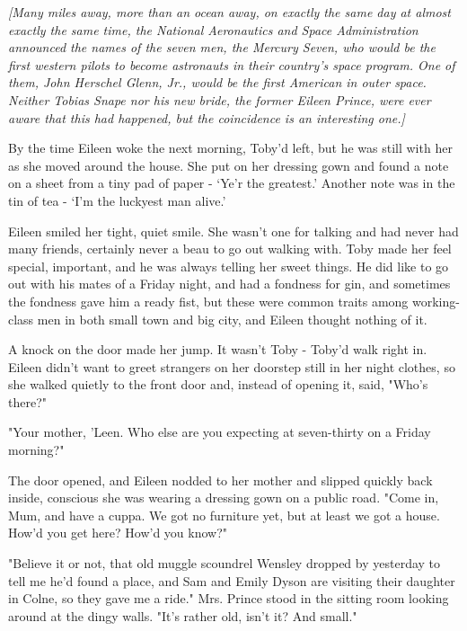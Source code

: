 \vspace{\baselineskip}

\emph{[Many miles away, more than an ocean away, on exactly the same day at almost exactly the same time, the National Aeronautics and Space Administration announced the names of the seven men, the Mercury Seven, who would be the first western pilots to become astronauts in their country's space program. One of them, John Herschel Glenn, Jr., would be the first American in outer space. Neither Tobias Snape nor his new bride, the former Eileen Prince, were ever aware that this had happened, but the coincidence is an interesting one.]}

\vspace{\baselineskip}

By the time Eileen woke the next morning, Toby'd left, but he was still with her as she moved around the house. She put on her dressing gown and found a note on a sheet from a tiny pad of paper - `Ye'r the greatest.' Another note was in the tin of tea - `I'm the luckyest man alive.'

Eileen smiled her tight, quiet smile. She wasn't one for talking and had never had many friends, certainly never a beau to go out walking with. Toby made her feel special, important, and he was always telling her sweet things. He did like to go out with his mates of a Friday night, and had a fondness for gin, and sometimes the fondness gave him a ready fist, but these were common traits among working-class men in both small town and big city, and Eileen thought nothing of it.

A knock on the door made her jump. It wasn't Toby - Toby'd walk right in. Eileen didn't want to greet strangers on her doorstep still in her night clothes, so she walked quietly to the front door and, instead of opening it, said, "Who's there?"

"Your mother, 'Leen. Who else are you expecting at seven-thirty on a Friday morning?"

The door opened, and Eileen nodded to her mother and slipped quickly back inside, conscious she was wearing a dressing gown on a public road. "Come in, Mum, and have a cuppa. We got no furniture yet, but at least we got a house. How'd you get here? How'd you know?"

"Believe it or not, that old muggle scoundrel Wensley dropped by yesterday to tell me he'd found a place, and Sam and Emily Dyson are visiting their daughter in Colne, so they gave me a ride." Mrs. Prince stood in the sitting room looking around at the dingy walls. "It's rather old, isn't it? And small."

